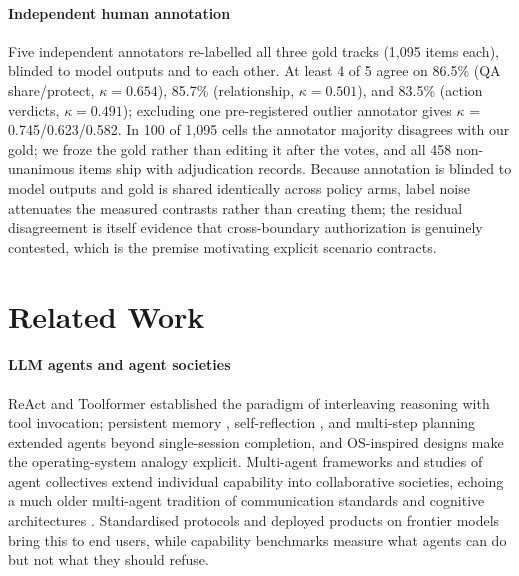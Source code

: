 \documentclass[10pt,a4paper]{article}
\begin{document}
\paragraph{Independent human annotation} Five independent annotators re-labelled all three gold tracks (1{,}095 items each), blinded to model outputs and to each other. At least 4 of 5 agree on 86.5\% (QA share/protect, $\kappa=0.654$), 85.7\% (relationship, $\kappa=0.501$), and 83.5\% (action verdicts, $\kappa=0.491$); excluding one pre-registered outlier annotator gives $\kappa$ = 0.745/0.623/0.582. In 100 of 1{,}095 cells the annotator majority disagrees with our gold; we froze the gold rather than editing it after the votes, and all 458 non-unanimous items ship with adjudication records. Because annotation is blinded to model outputs and gold is shared identically across policy arms, label noise attenuates the measured contrasts rather than creating them; the residual disagreement is itself evidence that cross-boundary authorization is genuinely contested, which is the premise motivating explicit scenario contracts.

\section{Related Work}
\label{sec:related}

\paragraph{LLM agents and agent societies} ReAct \cite{yao2023react} and Toolformer \cite{schick2023toolformer} established the paradigm of interleaving reasoning with tool invocation; persistent memory \cite{packer2024memgpt}, self-reflection \cite{shinn2023reflexion}, and multi-step planning \cite{wang2024planandsolve} extended agents beyond single-session completion, and OS-inspired designs \cite{mei2025aios,wu2024oscopilot} make the operating-system analogy explicit. Multi-agent frameworks \cite{wu2023autogen,hong2023metagpt,li2023camel,qian2023chatdev,crewai2024,langchain2023,langgraph2024} and studies of agent collectives \cite{talebirad2023multiagent,guo2024largelanguagemodelbased,park2023generative,wang2025revisitingboids,bran2024chemcrow,li2025rdagentquantmultiagentframeworkdatacentric} extend individual capability into collaborative societies, echoing a much older multi-agent tradition of communication standards and cognitive architectures \cite{fipa2002acl,bellifemine2007jade,laird2012soar,anderson2007actr,russell2020artificial}. Standardised protocols \cite{anthropic2024mcp,google2025a2a} and deployed products \cite{manus2025,devin2024,openclaw2025} on frontier models \cite{openai2023gpt4,anthropic2024claude} bring this to end users, while capability benchmarks \cite{liu2024agentbench,yao2022webshop,zhou2024webarena,jimenez2024swebench} measure what agents can do but not what they should refuse.
\end{document}

